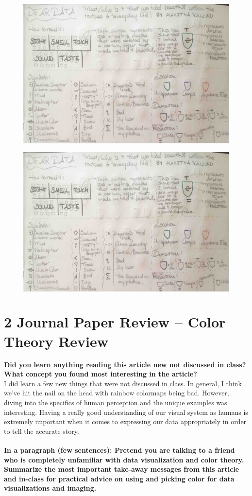 \documentclass{neu_handout}
\begin{document}
\begin{figure}[h]
\centering
{
\includegraphics[page=2,width=0.4\linewidth]{penpal}
}
\end{figure}

\begin{figure}[h]
\centering
{
\includegraphics[page=1,width=0.4\linewidth]{penpal}
}
\end{figure}

\section*{2 Journal Paper Review – Color Theory Review}

\textbf{Did you learn anything reading this article new not discussed in class?  What concept you found most interesting in the article?}\\

I did learn a few new things that were not discussed in class. In general, I think we've hit the nail on the head with rainbow colormaps being bad. However, diving into the specifics of human perception and the unique examples was interesting. Having a really good understanding of our visual system as humans is extremely important when it comes to expressing our data appropriately in order to tell the accurate story. \\\\

\textbf{In a paragraph (few sentences): Pretend you are talking to a friend who is completely unfamiliar with data visualization and color theory.  Summarize the most important take-away messages from this article and in-class for practical advice on using and picking color for data visualizations and imaging.}\\
\end{document}
